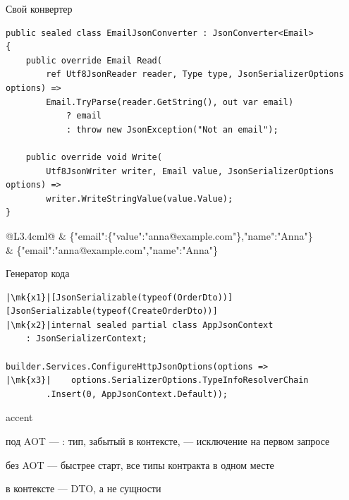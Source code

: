 \documentclass[aspectratio=169,10pt,t]{beamer}
\newcommand{\codesm}{\ttfamily\fontsize{7.6}{9.0}\selectfont}
\newcommand{\codexs}{\ttfamily\fontsize{7.0}{8.3}\selectfont}
\newcommand{\codexxs}{\ttfamily\fontsize{6.8}{7.8}\selectfont}
\newcommand{\mk}[1]{\tikz[remember picture,overlay]\coordinate (#1) at (0,0.55ex);}
\begin{document}
\begin{frame}[fragile]{Свой конвертер}
  \vspace{0.3em}
\begin{lstlisting}[style=csharp,basicstyle=\codexxs]
public sealed class EmailJsonConverter : JsonConverter<Email>
{
    public override Email Read(
        ref Utf8JsonReader reader, Type type, JsonSerializerOptions options) =>
        Email.TryParse(reader.GetString(), out var email)
            ? email
            : throw new JsonException("Not an email");

    public override void Write(
        Utf8JsonWriter writer, Email value, JsonSerializerOptions options) =>
        writer.WriteStringValue(value.Value);
}
\end{lstlisting}

  {\renewcommand{\arraystretch}{1.3}
  \begin{tabular}{@{}L{3.4cm}l@{}}
     & {\codexs \{"email":\{"value":"anna@example.com"\},"name":"Anna"\}} \\
      & {\codexs \{"email":"anna@example.com","name":"Anna"\}} \\
  \end{tabular}}

\end{frame}

\begin{frame}[fragile]{Генератор кода}
  \vspace{0.3em}
\begin{lstlisting}[style=csharp,basicstyle=\codesm,escapechar=|]
|\mk{x1}|[JsonSerializable(typeof(OrderDto))]
[JsonSerializable(typeof(CreateOrderDto))]
|\mk{x2}|internal sealed partial class AppJsonContext
    : JsonSerializerContext;

builder.Services.ConfigureHttpJsonOptions(options =>
|\mk{x3}|    options.SerializerOptions.TypeInfoResolverChain
        .Insert(0, AppJsonContext.Default));
\end{lstlisting}

  \slidegap
  \begin{cbul}{accent}
    \item под AOT --- : тип, забытый в контексте, --- исключение на
      первом запросе
    \item без AOT --- быстрее старт, все типы контракта в одном месте
    \item в контексте --- DTO, а не сущности
  \end{cbul}
\end{frame}
\end{document}
